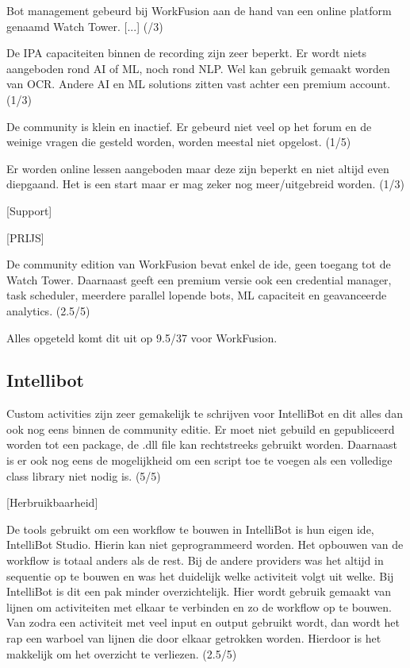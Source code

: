Bot management gebeurd bij WorkFusion aan de hand van een online platform genaamd Watch Tower. [...] (/3)

De IPA capaciteiten binnen de recording zijn zeer beperkt. Er wordt niets aangeboden rond AI of ML, noch rond NLP. Wel kan gebruik gemaakt worden van OCR. Andere AI en ML solutions zitten vast achter een premium account. (1/3)

De community is klein en inactief. Er gebeurd niet veel op het forum en de weinige vragen die gesteld worden, worden meestal niet opgelost. (1/5)

Er worden online lessen aangeboden maar deze zijn beperkt en niet altijd even diepgaand. Het is een start maar er mag zeker nog meer/uitgebreid worden. (1/3)

[Support]

[PRIJS]

De community edition van WorkFusion bevat enkel de ide, geen toegang tot de Watch Tower. Daarnaast geeft een premium versie ook een credential manager, task scheduler, meerdere parallel lopende bots, ML capaciteit en geavanceerde analytics. (2.5/5)

Alles opgeteld komt dit uit op 9.5/37 voor WorkFusion.

\subsection{Intellibot}

Custom activities zijn zeer gemakelijk te schrijven voor IntelliBot en dit alles dan ook nog eens binnen de community editie. Er moet niet gebuild en gepubliceerd worden tot een package, de .dll file kan rechtstreeks gebruikt worden. Daarnaast is er ook nog eens de mogelijkheid om een script toe te voegen als een volledige class library niet nodig is. (5/5)

[Herbruikbaarheid]

De tools gebruikt om een workflow te bouwen in IntelliBot is hun eigen ide, IntelliBot Studio. Hierin kan niet geprogrammeerd worden. Het opbouwen van de workflow is totaal anders als de rest. Bij de andere providers was het altijd in sequentie op te bouwen en was het duidelijk welke activiteit volgt uit welke. Bij IntelliBot is dit een pak minder overzichtelijk. Hier wordt gebruik gemaakt van lijnen om activiteiten met elkaar te verbinden en zo de workflow op te bouwen. Van zodra een activiteit met veel input en output gebruikt wordt, dan wordt het rap een warboel van lijnen die door elkaar getrokken worden. Hierdoor is het makkelijk om het overzicht te verliezen. (2.5/5)

